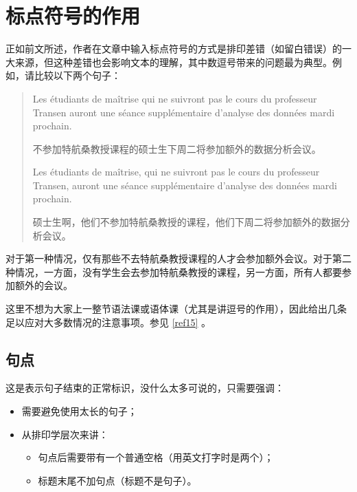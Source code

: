 \section{标点符号的作用}

正如前文所述，作者在文章中输入标点符号的方式是排印差错（如留白错误）的一大来源，但这种差错也会影响文本的理解，其中数逗号带来的问题最为典型。例如，请比较以下两个句子：

\begin{quote}
    Les étudiants de maîtrise qui ne suivront pas le cours du professeur Transen auront une séance supplémentaire d'analyse des données mardi prochain.
    \begin{bil}
        不参加特航桑教授课程的硕士生下周二将参加额外的数据分析会议。
    \end{bil}

    Les étudiants de maîtrise, qui ne suivront pas le cours du professeur Transen, auront une séance supplémentaire d'analyse des données mardi prochain.
    \begin{bil}
        硕士生啊，他们不参加特航桑教授的课程，他们下周二将参加额外的数据分析会议。
    \end{bil}
\end{quote}

对于第一种情况，仅有那些不去特航桑教授课程的人才会参加额外会议。对于第二种情况，一方面，没有学生会去参加特航桑教授的课程，另一方面，所有人都要参加额外的会议。

这里不想为大家上一整节语法课或语体课（尤其是讲逗号的作用），因此给出几条足以应对大多数情况的注意事项。参见 \ref{ref15} 。

\subsection{句点}\label{sec5.2.1}

这是表示句子结束的正常标识，没什么太多可说的，只需要强调：

\begin{itemize}
    \item 需要避免使用太长的句子；
    \item 从排印学层次来讲：
    \begin{itemize}
        \item 句点后需要带有一个普通空格（用英文打字时是两个）；
        \item 标题末尾不加句点（标题不是句子）。
    \end{itemize}
\end{itemize}

